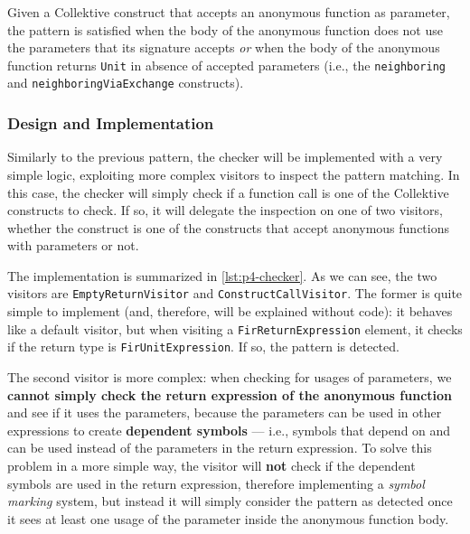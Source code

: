\documentclass[12pt,a4paper,openright,twoside]{book}
\begin{document}
Given a Collektive construct that accepts an anonymous function as parameter,
the pattern is satisfied when the body of the anonymous function does not use the
parameters that its signature accepts \emph{or} when the body of the anonymous
function returns \lstinline{Unit} in absence of accepted parameters (i.e., the
\lstinline{neighboring} and \lstinline{neighboringViaExchange} constructs).

\subsubsection{Design and Implementation}

Similarly to the previous pattern, the checker will be implemented with a very
simple logic, exploiting more complex visitors to inspect the pattern matching.
In this case, the checker will simply check if a function call is one of the 
Collektive constructs to check. If so, it will delegate the inspection on one
of two visitors, whether the construct is one of the constructs that accept
anonymous functions with parameters or not.

The implementation is summarized in \cref{lst:p4-checker}. As we can see, the
two visitors are \lstinline{EmptyReturnVisitor} and
\lstinline{ConstructCallVisitor}. The former is quite simple to implement (and,
therefore, will be explained without code): it behaves like a default
visitor, but when visiting a \lstinline{FirReturnExpression} element, it checks
if the return type is \lstinline{FirUnitExpression}. If so, the pattern is
detected.



The second visitor is more complex: when checking for usages of parameters, we
\textbf{cannot simply check the return expression of the anonymous function} and
see if it uses the parameters, because the parameters can be used in other
expressions to create \textbf{dependent symbols} --- i.e., symbols that depend
on and can be used instead of the parameters in the return expression.
%
To solve this problem in a more simple way, the visitor will \textbf{not} check
if the dependent symbols are used in the return expression, therefore
implementing a \emph{symbol marking} system, but instead it will simply consider
the pattern as detected once it sees at least one usage of the parameter inside
the anonymous function body.  
\end{document}
